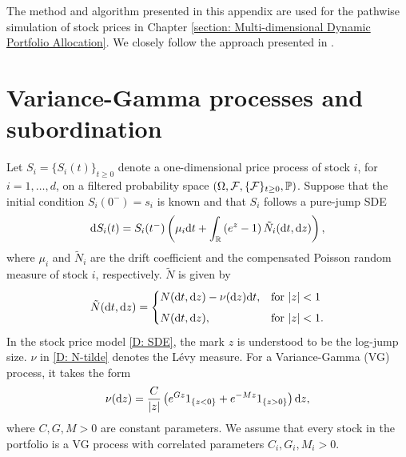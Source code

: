 \label{Appendix: Stock Scenario Generator}

The method and algorithm presented in this appendix are used for the pathwise simulation of stock prices in Chapter \ref{section: Multi-dimensional Dynamic Portfolio Allocation}. We closely follow the approach presented in \cite{Luciano02072016, LUCIANO20101937}.

\section{Variance-Gamma processes and subordination}
Let $S_i=\{S_i(t)\}_{t \geq 0}$ denote a one-dimensional price process of stock $i$, for $i=1,\ldots,d$, on a filtered probability space $(\Omega, \mathcal{F}, \{\mathcal{F}\}_{t \geq 0}, \mathbb{P})$. Suppose that the initial condition $S_i(0^-) = s_i$ is known and that $S_i$ follows a pure-jump SDE
\begin{equation}
    \mathrm{d} S_i(t) = S_i(t^-) \left( \mu_i \mathrm{d} t + \int_{\mathbb{R}}\left(e^z-1\right) \tilde N_i(\mathrm{d} t, \mathrm{d} z) \right),
    \label{D: SDE}
\end{equation}
where $\mu_i$ and $\tilde N_i$ are the drift coefficient and the compensated Poisson random measure of stock $i$, respectively. $\tilde N$ is given by
\begin{equation}
    \tilde N(\mathrm{d} t, \mathrm{d} z) = 
    \begin{cases}
        N(\mathrm{d} t, \mathrm{d} z) - \nu(\mathrm{d} z) \mathrm{d} t, & \text{for } |z| < 1 \\[1ex]
        N(\mathrm{d} t, \mathrm{d} z), & \text{for } |z| < 1.
    \end{cases}
    \label{D: N-tilde}
\end{equation}
In the stock price model \eqref{D: SDE}, the mark $z$ is understood to be the log-jump size. $\nu$ in \eqref{D: N-tilde} denotes the Lévy measure. For a Variance-Gamma (VG) process, it takes the form
\begin{equation*}
    \nu(\mathrm{d} z) = \frac{C}{|z|} \left( e^{Gz} 1_{\left\{z<0\right\}} + e^{-Mz} 1_{\left\{z>0\right\}} \right)\mathrm{d} z,
\end{equation*}
where $C,G,M > 0$ are constant parameters. We assume that every stock in the portfolio is a VG process with correlated parameters $C_i,G_i,M_i>0$. 

